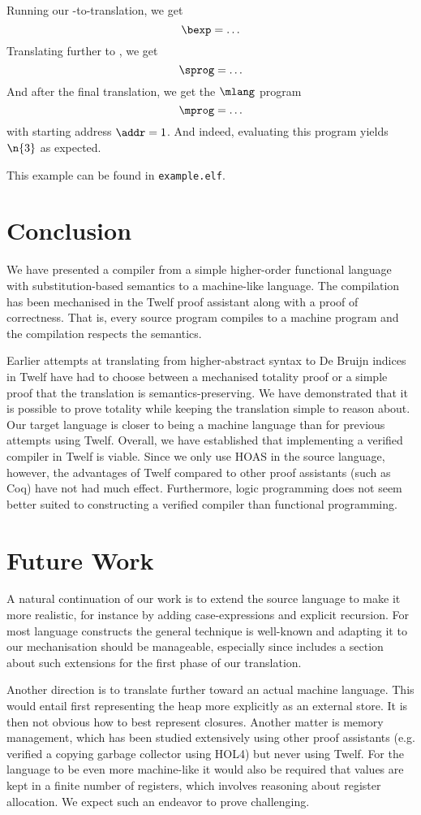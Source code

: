 Running our \hlang-to-\blang translation, we get
\[
\bexp = \ldots
\]
Translating further to \slang, we get
\[
\sprog = \ldots
\]
And after the final translation, we get the $\mlang$ program
\[
\mprog = \ldots
\]
with starting address $\addr = 1$.
And indeed, evaluating this program yields $\n{3}$ as expected.

\Twelf
This example can be found in \texttt{example.elf}.

\section{Conclusion}

We have presented a compiler from a simple higher-order functional language with substitution-based semantics to a machine-like language.
The compilation has been mechanised in the Twelf proof assistant along with a proof of correctness.
That is, every source program compiles to a machine program and the compilation respects the semantics.

Earlier attempts at translating from higher-abstract syntax to De Bruijn indices in Twelf have had to choose between a mechanised totality proof or a simple proof that the translation is semantics-preserving.
We have demonstrated that it is possible to prove totality while keeping the translation simple to reason about.
Our target language is closer to being a machine language than for previous attempts using Twelf.
Overall, we have established that implementing a verified compiler in Twelf is viable.
Since we only use HOAS in the source language, however, the advantages of Twelf compared to other proof assistants (such as Coq) have not had much effect.
Furthermore, logic programming does not seem better suited to constructing a verified compiler than functional programming.


\section{Future Work}

A natural continuation of our work is to extend the source language to make it more realistic, for instance by adding case-expressions and explicit recursion.
For most language constructs the general technique is well-known and adapting it to our mechanisation should be manageable, especially since \cite{Pfenning01} includes a section about such extensions for the first phase of our translation.

Another direction is to translate further toward an actual machine language.
This would entail first representing the heap more explicitly as an external store.
It is then not obvious how to best represent closures.
Another matter is memory management, which has been studied extensively using other proof assistants (e.g. \cite{Myreen10} verified a copying garbage collector using HOL4) but never using Twelf.
For the language to be even more machine-like it would also be required that values are kept in a finite number of registers, which involves reasoning about register allocation.
We expect such an endeavor to prove challenging.

